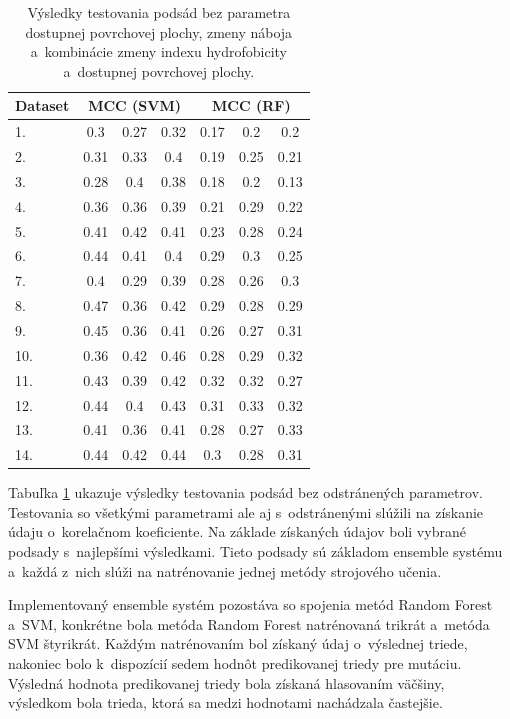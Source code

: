 \begin{table}[H]
	\centering
	\begin{tabular}{|l |c |c |c |c |c |c|}
	\hline
	Dataset & \multicolumn{3}{c|}{MCC (SVM)} & \multicolumn{3}{c|}{MCC (RF)} \\ \cline{1-7}
	\hline 
	1. & 0.3 & 0.27 & 0.32 & 0.17 & 0.2 & 0.2 \\ \cline{1-7} 
	2. & 0.31 & 0.33 & 0.4 & 0.19 & 0.25 & 0.21\\ \cline{1-7} 
	3. & 0.28 & 0.4 & 0.38 & 0.18 & 0.2 & 0.13 \\ \cline{1-7}
	4. & 0.36 & 0.36 & 0.39 & 0.21 & 0.29 & 0.22 \\ \cline{1-7}
	5. & 0.41 & 0.42 & 0.41 & 0.23 & 0.28 & 0.24\\ \cline{1-7}
	6. & 0.44 & 0.41 & 0.4 & 0.29 & 0.3 & 0.25\\ \cline{1-7}
	7. & 0.4 & 0.29 & 0.39 & 0.28 & 0.26 & 0.3\\ \cline{1-7}
	8. & 0.47 & 0.36 & 0.42 & 0.29 & 0.28 & 0.29\\ \cline{1-7}
	9. & 0.45 & 0.36 & 0.41 & 0.26 & 0.27 & 0.31\\ \cline{1-7}
	10.& 0.36 & 0.42 & 0.46 & 0.28 & 0.29 & 0.32\\ \cline{1-7}
	11.& 0.43 & 0.39 & 0.42 & 0.32 & 0.32 & 0.27\\ \cline{1-7}
	12.& 0.44 & 0.4 & 0.43  & 0.31 & 0.33 & 0.32\\ \cline{1-7}
	13.& 0.41 & 0.36  & 0.41 & 0.28 & 0.27 & 0.33\\ \cline{1-7}
	14.& 0.44 & 0.42 & 0.44 & 0.3 & 0.28 &  0.31\\ \cline{1-7}
	\hline
	\end{tabular}
\caption {Výsledky testovania podsád bez parametra dostupnej povrchovej plochy, zmeny náboja a~kombinácie zmeny indexu hydrofobicity a~dostupnej povrchovej plochy.} 
\label{pythontest1} 
\end{table}


Tabuľka \ref{pythontest1} ukazuje výsledky testovania podsád bez odstránených parametrov. Testovania so všetkými parametrami ale aj s~odstránenými slúžili na získanie údaju o~korelačnom koeficiente. Na základe získaných údajov boli vybrané podsady s~najlepšími výsledkami. Tieto podsady sú základom ensemble systému a~každá z~nich slúži na natrénovanie jednej metódy strojového učenia.

Implementovaný ensemble systém pozostáva so spojenia metód Random Forest a~SVM, konkrétne bola metóda Random Forest natrénovaná trikrát a~metóda SVM štyrikrát. Každým natrénovaním bol získaný údaj o~výslednej triede, nakoniec bolo k~dispozícií sedem hodnôt predikovanej triedy pre mutáciu. Výsledná hodnota predikovanej triedy bola získaná hlasovaním väčšiny, výsledkom bola trieda, ktorá sa medzi hodnotami nachádzala častejšie.

